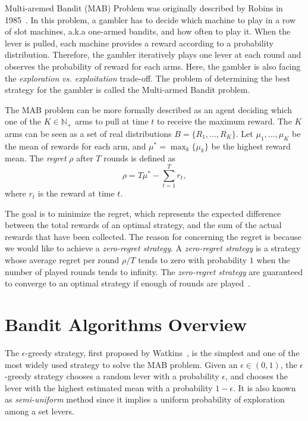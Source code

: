 Multi-aremed Bandit (MAB) Problem was originally described by Robins in 1985~\cite{Robbins:1985:MAB}.
In this problem, a gambler has to decide which machine to play in a row of slot machines, a.k.a one-armed bandits, and how often to play it.
When the lever is pulled, each machine provides a reward according to a probability distribution.
Therefore, the gambler iteratively plays one lever at each round and observes the probability of reward for each arms.
Here, the gambler is also facing the \textit{exploration vs. exploitation} trade-off.
The problem of determining the best strategy for the gambler is called the Multi-armed Bandit problem.


The MAB problem can be more formally described as 
an agent deciding which one of the $K \in \mathbb{N}_+$ arms to pull at time $t$ to receive the maximum reward.
The $K$ arms can be seen as a set of real distributions $B = \{ R_1, ..., R_K \} $.
Let $\mu_1, ..., \mu_K$ be the mean of rewards for each arm, and $\mu^* = \max_{k} \{ \mu_k \}$ be the highest reward mean.
The \textit{regret} $\rho$ after $T$ rounds is defined as
\begin{displaymath}
\rho = T\mu^* - \sum_{t=1}^{T} r_t,
\end{displaymath}
where $r_t$ is the reward at time $t$.

The goal is to minimize the regret, which represents the expected difference between the total rewards of an optimal strategy,
and the sum of the actual rewards that have been collected.  
The reason for concerning the regret is because we would like to achieve a \textit{zero-regret strategy}.
A \textit{zero-regret strategy} is a strategy whose average regret per round $\rho / T$ tends to zero with probability $1$ 
when the number of played rounds tends to infinity.
The \textit{zero-regret strategy} are guaranteed to converge to an optimal strategy if enough of rounds are played~\cite{Vermorel:2005:MAB}.



\section{Bandit Algorithms Overview}

The $\epsilon$-greedy strategy, first proposed by Watkins~\cite{Watkins:1989:eta}, 
is the simplest and one of the most widely used strategy to solve the MAB problem.
Given an $\epsilon \in (0,1)$,
the $\epsilon$-greedy strategy chooses a random lever with a probability $\epsilon$, 
and chooses the lever with the highest estimated mean with a probability $1 - \epsilon$.
It is also known as \textit{semi-uniform} method since it implies a uniform probability of exploration among a set levers.

